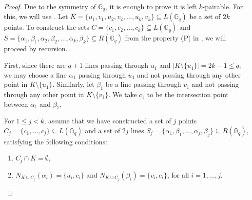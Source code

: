 \documentclass[10pt,a4paper]{article}
\newcommand{\ls}{\leqslant}
\newcommand{\G}[1][q]{\mathbb{G}_{#1}}
\begin{document}
\begin{proof}
    Due to the symmetry of $\G$, it is enough to prove it is left $k$-pairable. For this, we will use  . Let  $K = \{u_1,v_1, u_2,v_2, \dots, u_k, v_k\} \subseteq L(\G)$ be a set of $2k$  points. To construct the sets $C = \{c_1, c_2,\dots, c_k \} \subseteq L(\G)$ and  $S = \{\alpha_1,\beta_1, \alpha_2,\beta_2, \dots, \alpha_k, \beta_k\} \subseteq R(\G)$ from  the property (P)  in , we will proceed by recursion. 

    \medskip \noindent First, since there are $q+1$ lines passing through $u_1$ and $|K\setminus\{u_1\}| = 2k-1 \ls q$, we may choose a line $\alpha_1$ passing through $u_1$ and  not passing through any other point in  $K\setminus\{u_1\}$. Similarly, let $\beta_1$ be a line passing through $v_1$ and  not passing through any other point in  $K\setminus\{v_1\}$. We take  $c_1$ to be the intersection point between $\alpha_1$ and $\beta_1$.

    \medskip \noindent For $1\ls j < k$, assume that we have constructed a set of $j$ points $C_j = \{c_1, \dots, c_j \} \subseteq L(\G)$ and a set of $2j$ lines $S_j = \{\alpha_1,\beta_1,  \dots, \alpha_j, \beta_j\} \subseteq R(\G)$, satisfying the following conditions:
    \begin{enumerate}
        \item $C_j \cap K = \emptyset$,
        \item $N_{K \cup C_j} (\alpha_i) = \{u_i, c_i\}$ and $N_{K \cup C_j} (\beta_i) = \{v_i, c_i\}$, for all $i=1,\dots,j$.
    \end{enumerate}


\end{proof}
\end{document}
